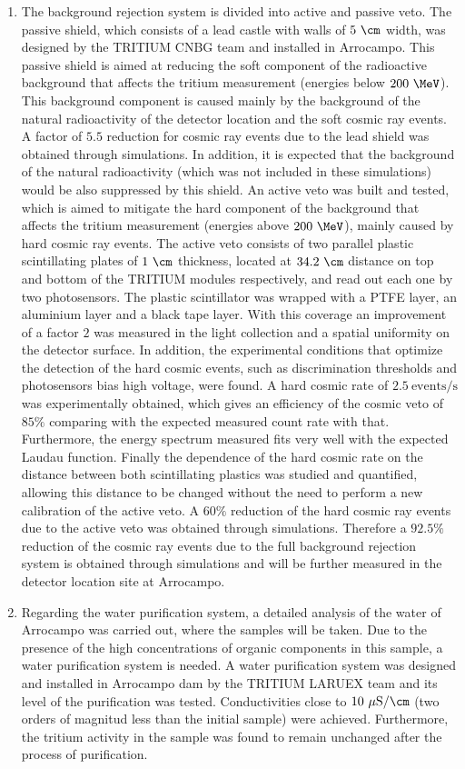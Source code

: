 \begin{enumerate}
\begin{enumerate}
\item{} The background rejection system is divided into active and passive veto. The passive shield, which consists of a lead castle with walls of $5~\cm$ width, was designed by the TRITIUM CNBG team and installed in Arrocampo. This passive shield is aimed at reducing the soft component of the radioactive background that affects the tritium measurement (energies below $200~\MeV$). This background component is caused mainly by the background of the natural radioactivity of the detector location and the soft cosmic ray events. A factor of $5.5$ reduction for cosmic ray events due to the lead shield was obtained through simulations. In addition, it is expected that the background of the natural radioactivity (which was not included in these simulations) would be also suppressed by this shield. An active veto was built and tested, which is aimed to mitigate the hard component of the background that affects the tritium measurement (energies above $200~\MeV$), mainly caused by hard cosmic ray events. The active veto consists of two parallel plastic scintillating plates of $1~\cm$ thickness, located at $34.2~\cm$ distance on top and bottom of the TRITIUM modules respectively, and read out each one by two photosensors. The plastic scintillator was wrapped with a PTFE layer, an aluminium layer and a black tape layer. With this coverage an improvement of a factor $2$ was measured in the light collection and a spatial uniformity on the detector surface. In addition, the experimental conditions that optimize the detection of the hard cosmic events, such as discrimination thresholds and photosensors bias high voltage, were found. A hard cosmic rate of $2.5~\text{events}/\text{s}$ was experimentally obtained, which gives an efficiency of the cosmic veto of $85\%$ comparing with the expected measured count rate with that. Furthermore, the energy spectrum measured fits very well with the expected Laudau function. Finally the dependence of the hard cosmic rate on the distance between both scintillating plastics was studied and quantified, allowing this distance to be changed without the need to perform a new calibration of the active veto. A $60\%$ reduction of the hard cosmic ray events due to the active veto was obtained through simulations. Therefore a $92.5\%$ reduction of the cosmic ray events due to the full background rejection system is obtained through simulations and will be further measured in the detector location site at Arrocampo.

\item{} Regarding the water purification system, a detailed analysis of the water of Arrocampo was carried out, where the samples will be taken. Due to the presence of the high concentrations of organic components in this sample, a water purification system is needed. A water purification system was designed and installed in Arrocampo dam by the TRITIUM LARUEX team and its level of the purification was tested. Conductivities close to $10~\mu\text{S}/\cm$ (two orders of magnitud less than the initial sample) were achieved. Furthermore, the tritium activity in the sample was found to remain unchanged after the process of purification.


\end{enumerate}
\end{enumerate}
